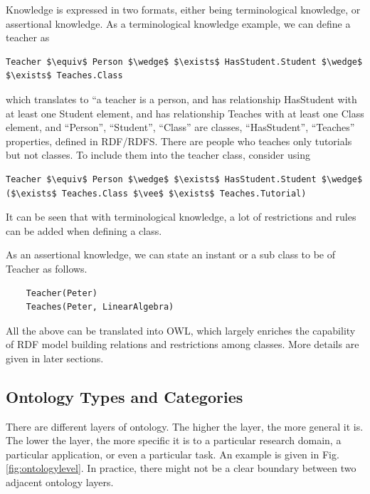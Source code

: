 Knowledge is expressed in two formats, either being terminological knowledge, or assertional knowledge. As a terminological knowledge example, we can define a teacher as
\begin{lstlisting}[mathescape=true]
	Teacher $\equiv$ Person $\wedge$ $\exists$ HasStudent.Student $\wedge$ $\exists$ Teaches.Class
\end{lstlisting}
which translates to ``a teacher is a person, and has relationship HasStudent with at least one Student element, and has relationship Teaches with at least one Class element, and ``Person'', ``Student'', ``Class'' are classes, ``HasStudent'', ``Teaches'' properties, defined in RDF/RDFS. There are people who teaches only tutorials but not classes. To include them into the teacher class, consider using
\begin{lstlisting}[mathescape=true]
	Teacher $\equiv$ Person $\wedge$ $\exists$ HasStudent.Student $\wedge$ ($\exists$ Teaches.Class $\vee$ $\exists$ Teaches.Tutorial)
\end{lstlisting}
It can be seen that with terminological knowledge, a lot of restrictions and rules can be added when defining a class.

As an assertional knowledge, we can state an instant or a sub class to be of Teacher as follows.
\begin{lstlisting}
	Teacher(Peter)
	Teaches(Peter, LinearAlgebra)
\end{lstlisting}

All the above can be translated into OWL, which largely enriches the capability of RDF model building relations and restrictions among classes. More details are given in later sections.


\subsection{Ontology Types and Categories}

There are different layers of ontology. The higher the layer, the more general it is. The lower the layer, the more specific it is to a particular research domain, a particular application, or even a particular task. An example is given in Fig. \ref{fig:ontologylevel}. In practice, there might not be a clear boundary between two adjacent ontology layers.

